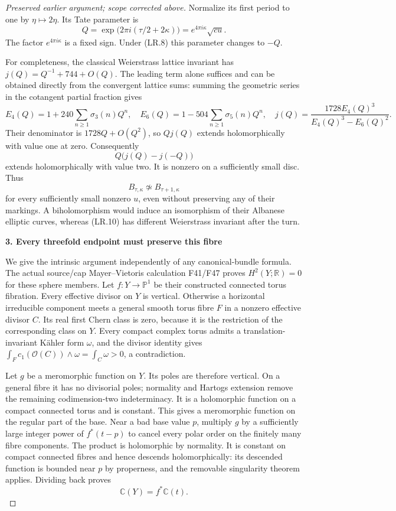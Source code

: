 \begin{proof}[Preserved earlier argument; scope corrected above]
Normalize its first period to one by \(\eta\mapsto2\eta\). Its
Tate parameter is
\[
 Q=\exp\bigl(2\pi i(\tau/2+2\kappa)\bigr)
    =e^{4\pi i\kappa}\sqrt{cu}.                     \tag{LR.10}
\]
The factor \(e^{4\pi i\kappa}\) is a fixed sign. Under (LR.8)
this parameter changes to \(-Q\).

For completeness, the classical Weierstrass lattice invariant has
\(j(Q)=Q^{-1}+744+O(Q)\). The leading term alone suffices and can
be obtained directly from the convergent lattice sums: summing the
geometric series in the cotangent partial fraction gives
\[
 E_4(Q)=1+240\sum_{n\ge1}\sigma_3(n)Q^n,
 \quad E_6(Q)=1-504\sum_{n\ge1}\sigma_5(n)Q^n,
 \quad
 j(Q)=\frac{1728E_4(Q)^3}{E_4(Q)^3-E_6(Q)^2}.
\]
Their denominator is \(1728Q+O(Q^2)\), so \(Qj(Q)\) extends
holomorphically with value one at zero. Consequently
\[
 Q\bigl(j(Q)-j(-Q)\bigr)
\]
extends holomorphically with value two. It is nonzero on a
sufficiently small disc. Thus
\[
            B_{\tau,\kappa}\not\simeq
            B_{\tau+1,\kappa}                       \tag{LR.11}
\]
for every sufficiently small nonzero \(u\), even without preserving
any of their markings. A biholomorphism would induce an isomorphism
of their Albanese elliptic curves, whereas (LR.10) has different
Weierstrass invariant after the turn.

\par

\medskip\noindent\textbf{3. Every threefold endpoint must preserve this fibre}

\par\nobreak

We give the intrinsic argument independently of any canonical-bundle
formula. The actual source/cap Mayer--Vietoris calculation F41/F47
proves \(H^2(Y;\mathbb R)=0\) for these sphere members. Let
\(f:Y\to\mathbb P^1\) be their constructed connected torus fibration.
Every effective divisor on \(Y\) is vertical. Otherwise a horizontal
irreducible component meets a general smooth torus fibre \(F\) in
a nonzero effective divisor \(C\). Its real first Chern class is
zero, because it is the restriction of the corresponding class on
\(Y\). Every compact complex torus admits a translation-invariant
Kähler form \(\omega\), and the divisor identity gives
\(\int_F c_1(\mathcal O(C))\wedge\omega=\int_C\omega>0\), a
contradiction.

Let \(g\) be a meromorphic function on \(Y\). Its poles are
therefore vertical. On a general fibre it has no divisorial poles;
normality and Hartogs extension remove the remaining codimension-two
indeterminacy. It is a holomorphic function on a compact connected
torus and is constant. This gives a meromorphic function on the
regular part of the base. Near a bad base value \(p\), multiply
\(g\) by a sufficiently large integer power of \(f^*(t-p)\) to
cancel every polar order on the finitely many fibre components.
The product is holomorphic by normality. It is constant on compact
connected fibres and hence descends holomorphically: its descended
function is bounded near \(p\) by properness, and the removable
singularity theorem applies. Dividing back proves
\[
                   \mathbb C(Y)=f^*\mathbb C(t).      \tag{LR.12}
\]


\end{proof}
